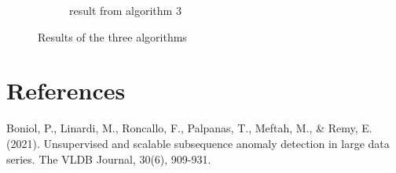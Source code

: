 \documentclass[11pt]{article}
\begin{document}
\begin{figure}[h]
\begin{subfigure}[b]{0.6\textwidth}
        \caption{result from algorithm 3}
        \label{fig:algo3}
    \end{subfigure}
    \caption{Results of the three algorithms}
    \label{fig:results}
\end{figure}



\section{References}
\label{ref1} Boniol, P., Linardi, M., Roncallo, F., Palpanas, T., Meftah, M., \& Remy, E. (2021). Unsupervised and scalable subsequence anomaly detection in large data series. The VLDB Journal, 30(6), 909-931.
\end{document}
